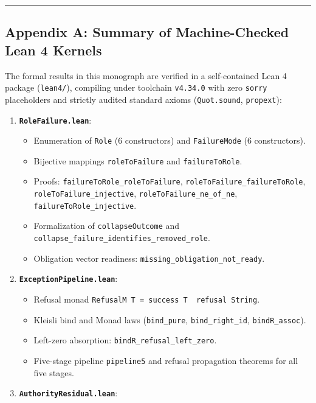 \documentclass[
  10pt,
]{article}
\providecommand{\tightlist}{%
  \setlength{\itemsep}{0pt}\setlength{\parskip}{0pt}}
\providecommand{\tightlist}{%
  \setlength{\itemsep}{0pt}\setlength{\parskip}{0pt}}
\begin{document}
\begin{center}\rule{0.5\linewidth}{0.5pt}\end{center}

\subsection{Appendix A: Summary of Machine-Checked Lean 4 Kernels}\label{appendix-a-summary-of-machine-checked-lean-4-kernels}

The formal results in this monograph are verified in a self-contained Lean 4 package (\texttt{lean4/}), compiling under toolchain \texttt{v4.34.0} with zero \texttt{sorry} placeholders and strictly audited standard axioms (\texttt{Quot.sound}, \texttt{propext}):

\begin{enumerate}
\def\labelenumi{\arabic{enumi}.}
\tightlist
\item
  \textbf{\texttt{RoleFailure.lean}}:

  \begin{itemize}
  \tightlist
  \item
    Enumeration of \texttt{Role} (6 constructors) and \texttt{FailureMode} (6 constructors).
  \item
    Bijective mappings \texttt{roleToFailure} and \texttt{failureToRole}.
  \item
    Proofs: \texttt{failureToRole\_roleToFailure}, \texttt{roleToFailure\_failureToRole}, \texttt{roleToFailure\_injective}, \texttt{roleToFailure\_ne\_of\_ne}, \texttt{failureToRole\_injective}.
  \item
    Formalization of \texttt{collapseOutcome} and \texttt{collapse\_failure\_identifies\_removed\_role}.
  \item
    Obligation vector readiness: \texttt{missing\_obligation\_not\_ready}.
  \end{itemize}
\item
  \textbf{\texttt{ExceptionPipeline.lean}}:

  \begin{itemize}
  \tightlist
  \item
    Refusal monad \texttt{RefusalM\ T\ =\ success\ T\ \textbar{}\ refusal\ String}.
  \item
    Kleisli bind and Monad laws (\texttt{bind\_pure}, \texttt{bind\_right\_id}, \texttt{bindR\_assoc}).
  \item
    Left-zero absorption: \texttt{bindR\_refusal\_left\_zero}.
  \item
    Five-stage pipeline \texttt{pipeline5} and refusal propagation theorems for all five stages.
  \end{itemize}
\item
  \textbf{\texttt{AuthorityResidual.lean}}:


\end{enumerate}
\end{document}

